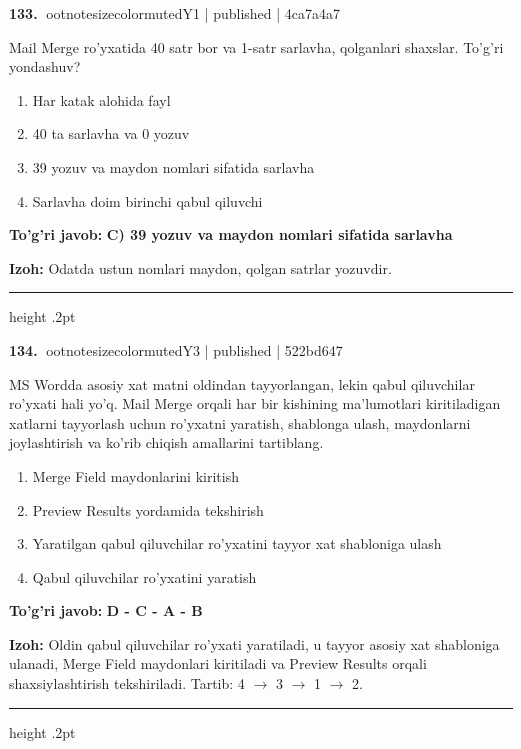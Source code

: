 \documentclass[10pt,a4paper]{article}
\begin{document}
\textbf{\color{ink}133.} {ootnotesizecolor{muted}Y1 | published | 4ca7a4a7}
\par
Mail Merge ro'yxatida 40 satr bor va 1-satr sarlavha, qolganlari shaxslar. To'g'ri yondashuv?
\begin{enumerate}[label=\Alph*),leftmargin=9mm]
\item Har katak alohida fayl
\item 40 ta sarlavha va 0 yozuv
\item 39 yozuv va maydon nomlari sifatida sarlavha
\item Sarlavha doim birinchi qabul qiluvchi
\end{enumerate}
\begin{tcolorbox}[enhanced,breakable,colback=teal!4,colframe=teal!55!black,boxrule=0.45pt,arc=1.2mm,left=2.8mm,right=2.8mm,top=2mm,bottom=2mm]
\textbf{\color{teal}To'g'ri javob:} \textbf{C) 39 yozuv va maydon nomlari sifatida sarlavha}
\par\smallskip
\textbf{Izoh:} Odatda ustun nomlari maydon, qolgan satrlar yozuvdir.
\end{tcolorbox}
\vspace{2mm}\hrule height .2pt\vspace{2mm}

\textbf{\color{ink}134.} {ootnotesizecolor{muted}Y3 | published | 522bd647}
\par
MS Wordda asosiy xat matni oldindan tayyorlangan, lekin qabul qiluvchilar ro'yxati hali yo'q. Mail Merge orqali har bir kishining ma'lumotlari kiritiladigan xatlarni tayyorlash uchun ro'yxatni yaratish, shablonga ulash, maydonlarni joylashtirish va ko'rib chiqish amallarini tartiblang.
\begin{enumerate}[label=\Alph*),leftmargin=9mm]
\item Merge Field maydonlarini kiritish
\item Preview Results yordamida tekshirish
\item Yaratilgan qabul qiluvchilar ro'yxatini tayyor xat shabloniga ulash
\item Qabul qiluvchilar ro'yxatini yaratish
\end{enumerate}
\begin{tcolorbox}[enhanced,breakable,colback=teal!4,colframe=teal!55!black,boxrule=0.45pt,arc=1.2mm,left=2.8mm,right=2.8mm,top=2mm,bottom=2mm]
\textbf{\color{teal}To'g'ri javob:} \textbf{D - C - A - B}
\par\smallskip
\textbf{Izoh:} Oldin qabul qiluvchilar ro'yxati yaratiladi, u tayyor asosiy xat shabloniga ulanadi, Merge Field maydonlari kiritiladi va Preview Results orqali shaxsiylashtirish tekshiriladi. Tartib: 4 \ensuremath{\rightarrow} 3 \ensuremath{\rightarrow} 1 \ensuremath{\rightarrow} 2.
\end{tcolorbox}
\vspace{2mm}\hrule height .2pt\vspace{2mm}
\end{document}
